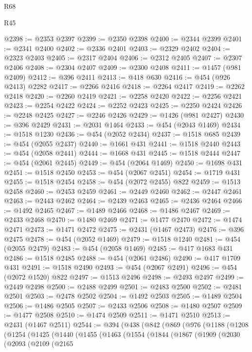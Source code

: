 \begin{lexlean}{R68}
\begin{lexlean}{R45}
\begin{coremodule}
{{{{{{{{{{{{{{{{{{{{{{{{{{{{{{{{{{{{{{{{{{{{{{{{{{{{{{{{{{{{{{{{{{{{{{{{{{{{{{{{{{{{{{{{{{{@2398 := @2353 @2397
@2399 := @2350 @2398
@2400 := @2344 @2399
@2401 := @2341 @2400
@2402 := @2336 @2401
@2403 := @2329 @2402
@2404 := @2323 @2403
@2405 := @2317 @2404
@2406 := @2312 @2405
@2407 := @2307 @2406
@2408 := @2304 @2407
@2409 := @2300 @2408
@2411 := @1457 (@981 @2409)
@2412 := @396 @2411
@2413 := @418 @630
@2416 := @454 (@926 @2413) @2282
@2417 := @2266 @2416
@2418 := @2264 @2417
@2419 := @2262 @2418
@2420 := @2260 @2419
@2421 := @2258 @2420
@2422 := @2256 @2421
@2423 := @2254 @2422
@2424 := @2252 @2423
@2425 := @2250 @2424
@2426 := @2248 @2425
@2427 := @2246 @2426
@2429 := @1426 (@981 @2427)
@2430 := @396 @2429
@2431 := @2031 @1464
@2433 := @454 (@2043 @1469)
@2434 := @1518 @1230
@2436 := @454 (@2052 @2434)
@2437 := @1518 @685
@2439 := @454 (@2055 @2437)
@2440 := @1661 @431
@2441 := @1518 @2440
@2443 := @454 (@2058 @2441)
@2444 := @1668 @431
@2445 := @1518 @2444
@2447 := @454 (@2061 @2445)
@2449 := @454 (@2064 @1469)
@2450 := @1698 @431
@2451 := @1518 @2450
@2453 := @454 (@2067 @2451)
@2454 := @1719 @431
@2455 := @1518 @2454
@2458 := @454 (@2072 @2455) @822
@2459 := @1513 @2458
@2460 := @2453 @2459
@2461 := @2449 @2460
@2462 := @2447 @2461
@2463 := @2443 @2462
@2464 := @2439 @2463
@2465 := @2436 @2464
@2466 := @1492 @2465
@2467 := @1489 @2466
@2468 := @1486 @2467
@2469 := @2433 @2468
@2470 := @1480 @2469
@2471 := @1477 @2470
@2472 := @1474 @2471
@2473 := @1471 @2472
@2475 := @2431 (@1467 @2473)
@2476 := @396 @2475
@2478 := @454 (@2052 @1469)
@2479 := @1518 @1240
@2481 := @454 (@2055 @2479)
@2483 := @454 (@2058 @1469)
@2485 := @417 @1683 @431
@2486 := @1518 @2485
@2488 := @454 (@2061 @2486)
@2490 := @417 @1709 @431
@2491 := @1518 @2490
@2493 := @454 (@2067 @2491)
@2496 := @454 (@2072 @1520) @822
@2497 := @1513 @2496
@2498 := @2493 @2497
@2499 := @2449 @2498
@2500 := @2488 @2499
@2501 := @2483 @2500
@2502 := @2481 @2501
@2503 := @2478 @2502
@2504 := @1492 @2503
@2505 := @1489 @2504
@2506 := @1486 @2505
@2507 := @2433 @2506
@2508 := @1480 @2507
@2509 := @1477 @2508
@2510 := @1474 @2509
@2511 := @1471 @2510
@2513 := @2431 (@1467 @2511)
@2544 := @394
    (@438
      (@842
        (@869
          (@976
            (@1188
              (@1208
                (@1254
                  (@1425
                    (@1440
                      (@1455
                        (@1463
                          (@1554
                            (@1844
                              (@1867
                                (@1909
                                  (@2030
                                    (@2093
                                      (@2109
                                        (@2165
}}}}}}}}}}}}}}}}}}}}}}}}}}}}}}}}}}}}}}}}}}}}}}}}}}}}}}}}}}}}}}}}}}}}}}}}}}}}}}}}}}}}}}}}}}}
\end{coremodule}
\end{lexlean}
\end{lexlean}
